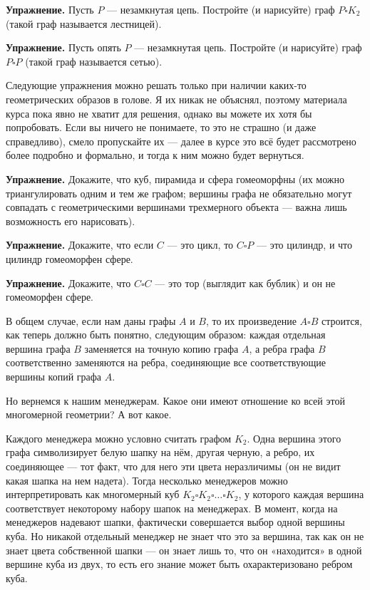 {\bfseries Упражнение.} Пусть $P$ — незамкнутая цепь. Постройте (и нарисуйте) граф $P\square K_2$ (такой граф называется лестницей).

{\bfseries Упражнение.} Пусть опять $P$ — незамкнутая цепь. Постройте (и нарисуйте) граф $P\square P$ (такой граф называется сетью).

Следующие упражнения можно решать только при наличии каких-то геометрических образов в голове. Я их никак не объяснял, поэтому материала курса пока явно не хватит для решения, однако вы можете их хотя бы попробовать. Если вы ничего не понимаете, то это не страшно (и даже справедливо), смело пропускайте их — далее в курсе это всё будет рассмотрено более подробно и формально, и тогда к ним можно будет вернуться.

{\bfseries Упражнение.} Докажите, что куб, пирамида и сфера гомеоморфны (их можно триангулировать одним и тем же графом; вершины графа не обязательно могут совпадать с геометрическими вершинами трехмерного объекта — важна лишь возможность его нарисовать).

{\bfseries Упражнение.} Докажите, что если $C$ — это цикл, то $C\square P$ — это цилиндр, и что цилиндр гомеоморфен сфере.

{\bfseries Упражнение.} Докажите, что $C\square C$ — это тор (выглядит как бублик) и он не гомеоморфен сфере.

В общем случае, если нам даны графы $A$ и $B$, то их произведение $A\square B$ строится, как теперь должно быть понятно, следующим образом: каждая отдельная вершина графа $B$ заменяется на точную копию графа $A$, а ребра графа $B$ соответственно заменяются на ребра, соединяющие все соответствующие вершины копий графа $A$.

Но вернемся к нашим менеджерам. Какое они имеют отношение ко всей этой многомерной геометрии? А вот какое.

Каждого менеджера можно условно считать графом $K_2$. Одна вершина этого графа символизирует белую шапку на нём, другая черную, а ребро, их соединяющее — тот факт, что для него эти цвета неразличимы (он не видит какая шапка на нем надета). Тогда несколько менеджеров можно интерпретировать как многомерный куб $K_2 \square K_2 \square \ldots \square K_2$, у которого каждая вершина соответствует некоторому набору шапок на менеджерах. В момент, когда на менеджеров надевают шапки, фактически совершается выбор одной вершины куба. Но никакой отдельный менеджер не знает что это за вершина, так как он не знает цвета собственной шапки — он знает лишь то, что он «находится» в одной вершине куба из двух, то есть его знание может быть охарактеризовано ребром куба.

